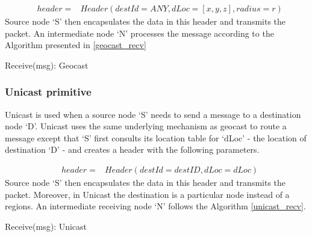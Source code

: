\begin{eqnarray*}
& header = & Header(destId=ANY, dLoc=[x,y,z], radius=r)
\end{eqnarray*}
Source node `S' then encapsulates the data in this header and transmits the packet. An intermediate node `N' processes the message according to the Algorithm presented in \ref{geocast_recv}

\begin{algorithm}
\caption{Receive(msg): Geocast} 
\label{geocast_recv}
\DontPrintSemicolon
{}
\end{algorithm}



\subsubsection{Unicast primitive}

Unicast is used when a source node `S' needs to send a message to a destination node `D'. Unicast uses the same underlying mechanism as geocast to route a message except that `S' first consults its location table for `dLoc' - the location of destination `D' - and creates a header with the following parameters.

\begin{eqnarray*}
& header = & Header(destId = destID, dLoc = dLoc)
\end{eqnarray*}
Source node `S' then encapsulates the data in this header and transmits the packet. Moreover, in Unicast the destination is a particular node instead of a regions. An intermediate receiving node `N' follows the Algorithm \ref{unicast_recv}.

\begin{algorithm}
\caption{Receive(msg): Unicast} 
\label{unicast_recv}
\DontPrintSemicolon
{}
\end{algorithm}


